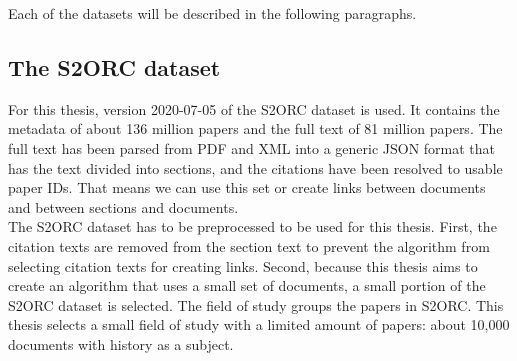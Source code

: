 \begin{table}[h!tbp]
    \centering
    \captionsetup{justification=centering}
    \caption{Datasets used by the research on long-document to long-document comparison.}
  	\label{tabDatasets}
\end{table}
Each of the datasets will be described in the following paragraphs.

\subsection{The S2ORC dataset}
\label{secS2orc}
For this thesis, version 2020-07-05 of the S2ORC dataset is used. It contains the metadata of about 136 million papers and the full text of 81 million papers. The full text has been parsed from PDF and XML into a generic JSON format that has the text divided into sections, and the citations have been resolved to usable paper IDs. That means we can use this set or create links between documents and between sections and documents.\\

The S2ORC dataset has to be preprocessed to be used for this thesis. First, the citation texts are removed from the section text to prevent the algorithm from selecting citation texts for creating links. Second, because this thesis aims to create an algorithm that uses a small set of documents, a small portion of the S2ORC dataset is selected. The field of study groups the papers in S2ORC. This thesis selects a small field of study with a limited amount of papers: about 10,000 documents with history as a subject.\\

